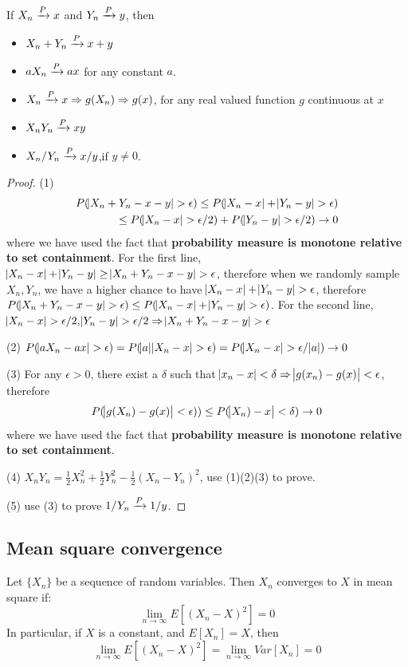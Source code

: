\begin{refsection}
\begin{lemma}
If $X_n \xrightarrow[ ]{P} x$ and $Y_n \xrightarrow[ ]{P} y$, then
\begin{itemize}
    \item $X_n+Y_n \xrightarrow[ ]{P} x + y$
    \item $aX_n \xrightarrow[ ]{P} ax$ for any constant $a$.
    \item $X_n \xrightarrow[ ]{P} x \Rightarrow g(X_n) \Rightarrow g(x)$, for any real valued function $g$ continuous at $x$
    \item $X_nY_n \xrightarrow[ ]{P} xy$
    \item $X_n/Y_n \xrightarrow[ ]{P} x/y$,if $y\neq 0$.
\end{itemize}
\end{lemma}
\begin{proof}
	(1) \cite[297]{hoggintroduction}
	\begin{align*}
	P(\abs{X_n+Y_n-x-y} > \epsilon) \leq P(\abs{X_n-x}+\abs{Y_n-y} > \epsilon) \\ 
	\leq P(\abs{X_n-x} > \epsilon/2) + P(\abs{Y_n-y} > \epsilon/2) \to 0
	\end{align*}
	where we have used the fact that \textbf{probability measure is monotone relative to set containment}. For the first line, $\abs{X_n-x}+\abs{Y_n-y} \geq \abs{X_n+Y_n-x-y} >\epsilon$, therefore when we randomly sample $X_n,Y_n$, we have a higher chance to have $\abs{X_n-x}+\abs{Y_n-y} > \epsilon$, therefore $P(\abs{X_n+Y_n-x-y} > \epsilon) \leq P(\abs{X_n-x}+\abs{Y_n-y} > \epsilon)$. For the second line,  $\abs{X_n-x} > \epsilon/2 ,\abs{Y_n-y} > \epsilon/2 \Rightarrow \abs{X_n+Y_n-x-y} > \epsilon$
	
	(2) $P(\abs{aX_n-ax} > \epsilon) =P(\abs{a}\abs{X_n-x} >\epsilon) = P(\abs{X_n-x} >\epsilon/\abs{a}) \to 0$
	
	(3) For any $\epsilon > 0$, there exist a $\delta$ such that $\abs{x_n - x} <\delta \Rightarrow \abs{g(x_n)-g(x)} < \epsilon$, therefore
	$$P(\abs{g(X_n)-g(x)} < \epsilon)) \leq P(\abs{X_n) - x} < \delta) \to 0$$
	where we have used the fact that \textbf{probability measure is monotone relative to set containment}. 
	
	(4) $X_nY_n = \frac{1}{2}X_n^2 + \frac{1}{2}Y_n^2 - \frac{1}{2}(X_n-Y_n)^2$, use (1)(2)(3) to prove. 
	
	(5) use (3) to prove $1/Y_n \xrightarrow[ ]{P} 1/y$.
\end{proof}





\subsection{Mean square convergence}
\begin{definition}
Let $\{X_n\}$ be a sequence of random variables. Then $X_n$ converges to $X$ in mean square if:
$$\lim_{n\rightarrow \infty }E[(X_n - X)^2] = 0$$
In particular, if $X$ is a constant, and $E[X_n] = X$, then
$$\lim_{n\rightarrow \infty }E[(X_n - X)^2] = \lim_{n\rightarrow \infty }Var[X_n] = 0$$
\end{definition}



\end{refsection}
